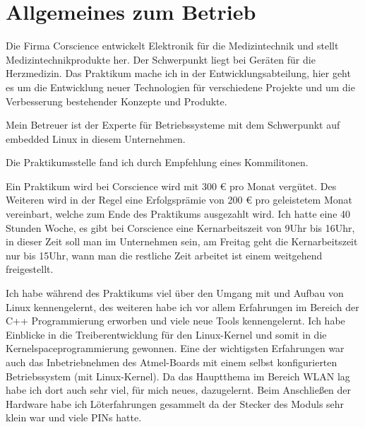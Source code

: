 \documentclass[pdftex,12pt,a4paper]{scrreprt}
\begin{document}

\tableofcontents

\begin{abstract}

\end{abstract}

\section{Allgemeines zum Betrieb}
Die Firma Corscience entwickelt Elektronik für die Medizintechnik und stellt Medizintechnikprodukte her.
Der Schwerpunkt liegt bei Geräten für die Herzmedizin.
Das Praktikum mache ich in der Entwicklungsabteilung, hier geht es um die Entwicklung neuer Technologien für verschiedene Projekte und um die Verbesserung bestehender Konzepte und Produkte.

Mein Betreuer ist der Experte für Betriebssysteme mit dem Schwerpunkt auf embedded Linux in diesem Unternehmen.

Die Praktikumsstelle fand ich durch Empfehlung eines Kommilitonen.

Ein Praktikum wird bei Corscience wird mit 300 € pro Monat
vergütet. Des Weiteren wird in der Regel eine Erfolgsprämie von 200 €
pro geleistetem Monat vereinbart, welche zum Ende des Praktikums
ausgezahlt wird.
Ich hatte eine 40 Stunden Woche, es gibt bei Corscience eine Kernarbeitszeit von 9Uhr bis 16Uhr, in dieser Zeit soll man im Unternehmen sein, am Freitag geht die Kernarbeitszeit nur bis 15Uhr, wann man die restliche Zeit arbeitet ist einem weitgehend freigestellt.

Ich habe während des Praktikums viel über den Umgang mit und Aufbau von Linux kennengelernt, des weiteren habe ich vor allem Erfahrungen im Bereich der C++ Programmierung erworben und viele neue Tools kennengelernt. Ich habe Einblicke in die Treiberentwicklung für den Linux-Kernel und somit in die Kernelspaceprogrammierung gewonnen. Eine der wichtigsten Erfahrungen war auch das Inbetriebnehmen des Atmel-Boards mit einem selbst konfigurierten Betriebssystem (mit Linux-Kernel). Da das Hauptthema im Bereich WLAN lag habe ich dort auch sehr viel, für mich neues, dazugelernt. Beim Anschließen der Hardware habe ich Löterfahrungen gesammelt da der Stecker des Moduls sehr klein war und viele PINs hatte.
\end{document}
